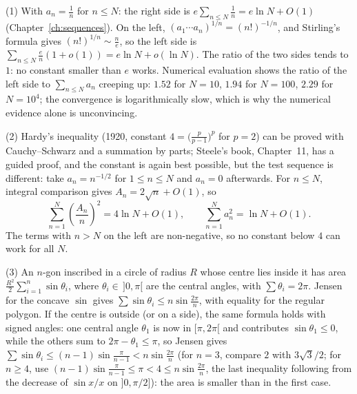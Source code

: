 (1) With $a_n=\frac1n$ for $n\le N$: the right side is $e\sum_{n\le N}\frac1n=e\ln N+O(1)$ (Chapter~\ref{ch:sequences}). On the left, $(a_1\cdots a_n)^{1/n}=(n!)^{-1/n}$, and Stirling's formula gives $(n!)^{1/n}\sim\frac ne$, so the left side is $\sum_{n\le N}\frac en(1+o(1))=e\ln N+o(\ln N)$. The ratio of the two sides tends to $1$: no constant smaller than $e$ works. Numerical evaluation shows the ratio of the left side to $\sum_{n\le N}a_n$ creeping up: $1.52$ for $N=10$, $1.94$ for $N=100$, $2.29$ for $N=10^4$; the convergence is logarithmically slow, which is why the numerical evidence alone is unconvincing.

(2) Hardy's inequality (1920, constant $4=\bigl(\frac p{p-1}\bigr)^p$ for $p=2$) can be proved with Cauchy--Schwarz and a summation by parts; Steele's book, Chapter~11, has a guided proof, and the constant is again best possible, but the test sequence is different: take $a_n=n^{-1/2}$ for $1\le n\le N$ and $a_n=0$ afterwards. For $n\le N$, integral comparison gives $A_n=2\sqrt n+O(1)$, so
\[
\sum_{n=1}^N\left(\frac{A_n}{n}\right)^2=4\ln N+O(1),
\qquad
\sum_{n=1}^N a_n^2=\ln N+O(1).
\]
The terms with $n>N$ on the left are non-negative, so no constant below $4$ can work for all $N$.

(3) An $n$-gon inscribed in a circle of radius $R$ whose centre lies inside it has area $\frac{R^2}2\sum_{i=1}^n\sin\theta_i$, where $\theta_i\in\,]0,\pi[$ are the central angles, with $\sum\theta_i=2\pi$. Jensen for the concave $\sin$ gives $\sum\sin\theta_i\le n\sin\frac{2\pi}n$, with equality for the regular polygon. If the centre is outside (or on a side), the same formula holds with signed angles: one central angle $\theta_1$ is now in $[\pi,2\pi[$ and contributes $\sin\theta_1\le0$, while the others sum to $2\pi-\theta_1\le\pi$, so Jensen gives $\sum\sin\theta_i\le(n-1)\sin\frac{\pi}{n-1}<n\sin\frac{2\pi}n$ (for $n=3$, compare $2$ with $3\sqrt3/2$; for $n\ge4$, use $(n-1)\sin\frac\pi{n-1}\le\pi<4\le n\sin\frac{2\pi}n$, the last inequality following from the decrease of $\sin x/x$ on $]0,\pi/2]$): the area is smaller than in the first case.

